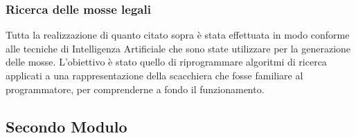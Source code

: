 \subsubsection{Ricerca delle mosse legali}
Tutta la realizzazione di quanto citato sopra è stata effettuata in modo conforme alle tecniche di Intelligenza Artificiale che sono state utilizzare per la generazione delle mosse. L'obiettivo è stato quello di riprogrammare algoritmi di ricerca applicati a una rappresentazione della scacchiera che fosse familiare al programmatore, per comprenderne a fondo il funzionamento. 
\subsection{Secondo Modulo}
    
\newpage

